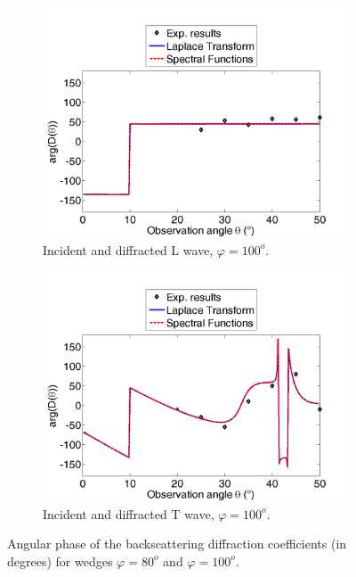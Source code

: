 \begin{figure}[h!]
	\begin{subfigure}[b]{0.45\textwidth}
        \includegraphics[width=\textwidth]{images/chapter3/Retrodiff_phase_100_L.png}
        \caption{Incident and diffracted L wave, $\varphi=100^o$.}
        \label{C3:DphL100}
    \end{subfigure}
    \hfill
    \begin{subfigure}[b]{0.45\textwidth}
        \includegraphics[width=\textwidth]{images/chapter3/Retrodiff_phase_100_T.png}
        \caption{Incident and diffracted T wave, $\varphi=100^o$.}
        \label{C3:DphT100}
     \end{subfigure}
     \caption{Angular phase of the backscattering diffraction coefficients (in degrees) for wedges $\varphi=80^o$ and $\varphi=100^o$.}
     \label{C3:expcoeffsph}
\end{figure}

